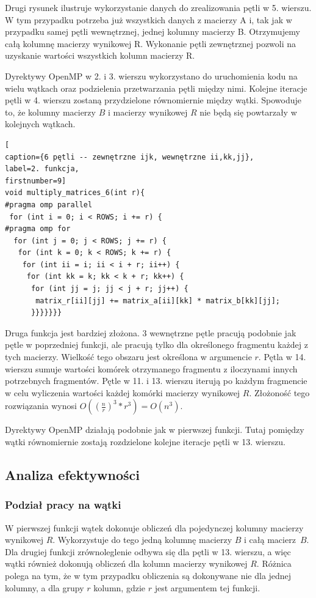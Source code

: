\documentclass{article}
\begin{document}
Drugi rysunek ilustruje wykorzystanie danych do zrealizowania pętli w 5. wierszu. W tym przypadku potrzeba już wszystkich danych z macierzy A i, tak jak w przypadku samej pętli wewnętrznej, jednej kolumny macierzy B. Otrzymujemy całą kolumnę macierzy wynikowej R. Wykonanie pętli zewnętrznej pozwoli na uzyskanie wartości wszystkich kolumn macierzy R.

Dyrektywy OpenMP w 2. i 3. wierszu wykorzystano do uruchomienia kodu na wielu wątkach oraz podzielenia przetwarzania pętli między nimi. Kolejne iteracje pętli w 4. wierszu zostaną przydzielone równomiernie między wątki. Spowoduje to, że kolumny macierzy $B$ i macierzy wynikowej $R$ nie będą się powtarzały w kolejnych wątkach.

\begin{lstlisting}[
caption={6 pętli -- zewnętrzne ijk, wewnętrzne ii,kk,jj},
label=2. funkcja,
firstnumber=9]
void multiply_matrices_6(int r){
#pragma omp parallel
 for (int i = 0; i < ROWS; i += r) {
#pragma omp for
  for (int j = 0; j < ROWS; j += r) {
   for (int k = 0; k < ROWS; k += r) {
    for (int ii = i; ii < i + r; ii++) {
     for (int kk = k; kk < k + r; kk++) {
      for (int jj = j; jj < j + r; jj++) {
       matrix_r[ii][jj] += matrix_a[ii][kk] * matrix_b[kk][jj];
      }}}}}}}
\end{lstlisting}

Druga funkcja jest bardziej złożona. 3 wewnętrzne pętle pracują podobnie jak pętle w poprzedniej funkcji, ale pracują tylko dla określonego fragmentu każdej z tych macierzy. Wielkość tego obszaru jest określona w argumencie $r$. Pętla w 14. wierszu sumuje wartości komórek otrzymanego fragmentu z iloczynami innych potrzebnych fragmentów. Pętle w 11. i 13. wierszu iterują po każdym fragmencie w celu wyliczenia wartości każdej komórki macierzy wynikowej $R$. Złożoność tego rozwiązania wynosi $O((\frac{n}{r})^3*r^3)=O(n^3)$.

Dyrektywy OpenMP działają podobnie jak w pierwszej funkcji. Tutaj pomiędzy wątki równomiernie zostają rozdzielone kolejne iteracje pętli w 13. wierszu.

\subsection{Analiza efektywności}
\subsubsection{Podział pracy na wątki}

W pierwszej funkcji wątek dokonuje obliczeń dla pojedynczej kolumny macierzy wynikowej $R$. Wykorzystuje do tego jedną kolumnę macierzy $B$ i całą macierz~$B$. Dla drugiej funkcji zrównoleglenie odbywa się dla pętli w 13. wierszu, a więc wątki również dokonują obliczeń dla kolumn macierzy wynikowej $R$. Różnica polega na tym, że w tym przypadku obliczenia są dokonywane nie dla jednej kolumny, a dla grupy $r$ kolumn, gdzie $r$ jest argumentem tej funkcji.
\end{document}
